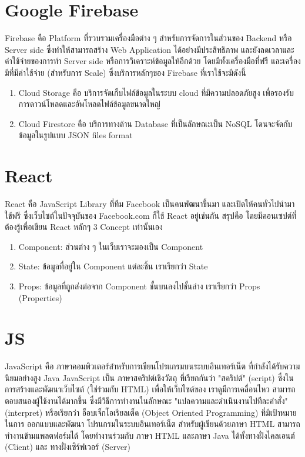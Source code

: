 \section{Google Firebase}
Firebase คือ Platform ที่รวบรวมเครื่องมือต่าง ๆ สำหรับการจัดการในส่วนของ Backend หรือ Server side
ซึ่งทำให้สามารถสร้าง Web Application ได้อย่างมีประสิทธิภาพ และยังลดเวลาและค่าใช้จ่ายของการทำ Server side
หรือการวิเคราะห์ข้อมูลให้อีกด้วย โดยมีทั้งเครื่องมือที่ฟรี และเครื่องมีที่มีค่าใช้จ่าย (สำหรับการ Scale) ซึ่งบริการหลักๆของ
Firebase ที่เราใช้จะมีดังนี้

\begin{enumerate}
  \item Cloud Storage คือ บริการจัดเก็บไฟล์ข้อมูลในระบบ cloud ที่มีความปลอดภัยสูง เพื่อรองรับการดาวน์โหลดและอัพโหลดไฟล์ข้อมูลขนาดใหญ่
  \item Cloud Firestore คือ บริการทางด้าน Database ที่เป็นลักษณะเป็น NoSQL โดนจะจัดกับข้อมูลในรูปแบบ JSON files format
\end{enumerate}

\section{React}
React คือ JavaScript Library ที่ทีม Facebook เป็นคนพัฒนาขึ้นมา และเปิดให้คนทั่วไปนำมาใช้ฟรี ซึ่งเว็บไซต์ในปัจจุบันของ
Facebook.com ก็ใช้ React อยู่เช่นกัน สรุปคือ โดยมีคอนเซปต์ที่ต้องรู้เพื่อเขียน React หลักๆ 3 Concept เท่านั้นเอง

\begin{enumerate}
  \item Component: ส่วนต่าง ๆ ในเว็บเราจะมองเป็น Component
  \item State: ข้อมูลที่อยู่ใน Component แต่ละชิ้น เราเรียกว่า State
  \item Props: ข้อมูลที่ถูกส่งต่อจาก Component ชั้นบนลงไปชั้นล่าง เราเรียกว่า Props (Properties)
\end{enumerate}


\section{JS}
JavaScript คือ ภาษาคอมพิวเตอร์สำหรับการเขียนโปรแกรมบนระบบอินเทอร์เน็ต ที่กำลังได้รับความนิยมอย่างสูง Java JavaScript
เป็น ภาษาสคริปต์เชิงวัตถุ ที่เรียกกันว่า "สคริปต์" (script) ซึ่งในการสร้างและพัฒนาเว็บไซต์ (ใช่ร่วมกับ HTML) เพื่อให้เว็บไซต์ของ
เราดูมีการเคลื่อนไหว สามารถตอบสนองผู้ใช้งานได้มากขึ้น ซึ่งมีวิธีการทำงานในลักษณะ "แปลความและดำเนินงานไปทีละคำสั่ง"
(interpret) หรือเรียกว่า อ็อบเจ็กโอเรียลเต็ด (Object Oriented Programming) ที่มีเป้าหมายในการ ออกแบบและพัฒนา
โปรแกรมในระบบอินเทอร์เน็ต สำหรับผู้เขียนด้วยภาษา HTML สามารถทำงานข้ามแพลตฟอร์มได้ โดยทำงานร่วมกับ ภาษา HTML และภาษา
Java ได้ทั้งทางฝั่งไคลเอนต์ (Client) และ ทางฝั่งเซิร์ฟเวอร์ (Server)

